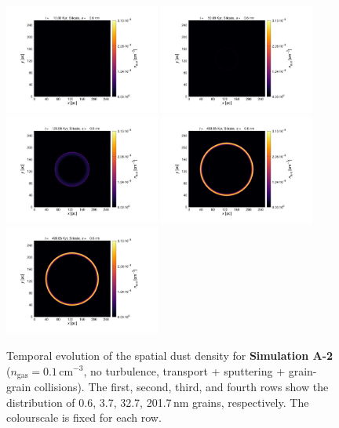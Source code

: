 \documentclass[fleqn,usenatbib]{mnras}
\begin{document}
\begin{figure}
  \includegraphics[trim=2.8cm 1.5cm 9.3cm 2.0cm, clip=true,page=4,height = 3.6cm]{Pics/Pics_A2/Density_1_00041.pdf}\hspace*{-0.05cm}
 \includegraphics[trim=5.2cm 1.5cm 9.3cm 2.0cm, clip=true,page=4,height = 3.6cm]{Pics/Pics_A2/Density_1_00201.pdf}\hspace*{-0.05cm}
 \includegraphics[trim=5.2cm 1.5cm 9.3cm 2.0cm, clip=true,page=4,height = 3.6cm]{Pics/Pics_A2/Density_1_00501.pdf}\hspace*{-0.05cm}
 \includegraphics[trim=5.2cm 1.5cm 9.3cm 2.0cm, clip=true,page=4,height = 3.6cm]{Pics/Pics_A2/Density_1_02000.pdf}\hspace*{-0.05cm}
 \includegraphics[trim=5.2cm 1.5cm 3.2cm 2.0cm, clip=true,page=4,height = 3.6cm]{Pics/Pics_A2/Density_1_02000.pdf}\\
  \caption{Temporal evolution of the spatial dust density for \textbf{Simulation A-2} ($n_\text{gas}=0.1\,\text{cm}^{-3}$, no turbulence, transport + sputtering + grain-grain collisions). The first, second, third, and fourth rows show the distribution of 0.6, 3.7, 32.7, 201.7$\,$nm grains, respectively. The colourscale is fixed for each row.}
   \label{fig_A2} 
  \end{figure}  
 
\end{document}
